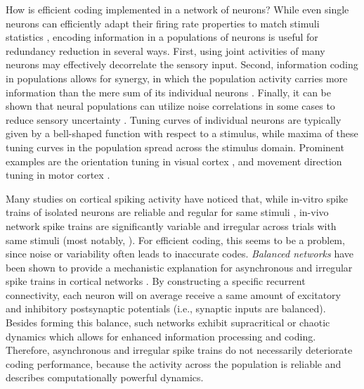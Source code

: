 \documentclass[twoside,twocolumn]{article}
\begin{document}
How is efficient coding implemented in a network of neurons? While even single neurons can efficiently adapt their firing rate properties to match stimuli statistics \cite{Srinivasan1982, Brenner2000}, encoding information in a populations of neurons is useful for redundancy reduction in several ways. First, using joint activities of many neurons may effectively decorrelate the sensory input. Second, information coding in populations allows for synergy, in which the population activity carries more information than the mere sum of its individual neurons \cite{Brenner2000b}. Finally, it can be shown that neural populations can utilize noise correlations in some cases to reduce sensory uncertainty \cite{Salinas2001, Averbeck2006}. Tuning curves of individual neurons are typically given by a bell-shaped function with respect to a stimulus, while maxima of these tuning curves in the population spread across the stimulus domain. Prominent examples are the orientation tuning in visual cortex \cite{Hubel1962}, and movement direction tuning in motor cortex \cite{Georgopoulos1986}.

Many studies on cortical spiking activity have noticed that, while in-vitro spike trains of isolated neurons are reliable and regular for same stimuli \cite{Mainen1995}, in-vivo network spike trains are significantly variable and irregular across trials with same stimuli (most notably, \cite{Shadlen1998}). For efficient coding, this seems to be a problem, since noise or variability often leads to inaccurate codes. \textit{Balanced networks} have been shown to provide a mechanistic explanation for asynchronous and irregular spike trains in cortical networks \cite{VanVreeswijk1996, Renart2010}. By constructing a specific recurrent connectivity, each neuron will on average receive a same amount of excitatory and inhibitory postsynaptic potentials (i.e., synaptic inputs are balanced). Besides forming this balance, such networks exhibit supracritical or chaotic dynamics which allows for enhanced information processing and coding. Therefore, asynchronous and irregular spike trains do not necessarily deteriorate coding performance, because the activity across the population is reliable and describes computationally powerful dynamics. 
\end{document}
